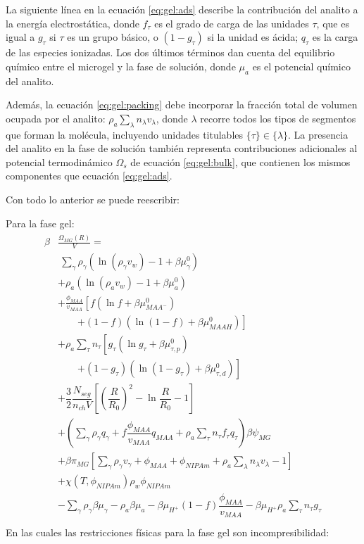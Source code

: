 La siguiente l\'inea en la ecuaci\'on \ref{eq:gel:ads} describe la contribuci\'on del analito a la energ\'ia electrost\'atica, donde $f_\tau$ es el grado de carga de las unidades $\tau$, que es igual a $g_\tau$ si $\tau$ es un grupo b\'asico, o $(1-g_\tau)$ si la unidad es \'acida; $q_\tau$ es la carga de las especies ionizadas.
Los dos \'ultimos t\'erminos dan cuenta del equilibrio qu\'imico entre el microgel y la fase de soluci\'on, donde $\mu_a$ es el potencial qu\'imico del analito.

Adem\'as, la ecuaci\'on \ref{eq:gel:packing} debe incorporar la fracci\'on total de volumen ocupada por el analito: $\rho_a \sum_\lambda n_\lambda v_\lambda$, donde $\lambda$ recorre todos los tipos de segmentos que forman la mol\'ecula, incluyendo unidades titulables $\{\tau\}\in\{\lambda\}$.
La presencia del analito en la fase de soluci\'on tambi\'en representa contribuciones adicionales al potencial termodin\'amico $\Omega_s$ de ecuaci\'on \ref{eq:gel:bulk}, que contienen los mismos componentes que ecuaci\'on \ref{eq:gel:ads}.

Con todo lo anterior se puede reescribir:

Para la fase gel:
\begin{align}
	\begin{aligned}
		\beta&\frac{\Omega_{MG}(R)}{V}=\\
		& ~ \sum_{\gamma} \rho_\gamma\left(\ln\left(\rho_\gamma v_w\right) -1 + \beta\mu^0_\gamma\right) \\
		&+ \rho_a\left(\ln\left(\rho_a v_w\right) -1 + \beta\mu^0_a\right) \\
		& + \frac{\phi_{MAA}}{v_{MAA}} \left[f(\ln f+ \beta\mu^0_{MAA^-})\right.\\
		&\qquad\left.+(1-f)(\ln (1-f)+\beta\mu^0_{MAAH})\right] \\
		& + \rho_a \sum_\tau n_\tau  \left[g_\tau(\ln g_\tau+ \beta\mu^0_{\tau,p})\right.\\
		&\qquad\left.+(1-g_\tau)(\ln (1-g_\tau)+\beta\mu^0_{\tau,d})\right] \\
		& + \dfrac{3}{2}\dfrac{N_{seg}}{n_{ch} V}\left[\left(\dfrac{R}{R_0}\right)^2 - \ln\dfrac{R}{R_0} -1\right] \\
		& +  \left(\sum_{\gamma } {\rho_\gamma q_\gamma + f\dfrac{\phi_{MAA}}{v_{MAA}}q_{MAA}} + \rho_a \sum_\tau n_\tau f_\tau q_\tau \right)\beta\psi_{MG}\\
		& +\beta\pi_{MG} \left[ \sum_{\gamma } \rho_\gamma v_\gamma  + \phi_{MAA} + \phi_{NIPAm} + \rho_a \sum_\lambda n_\lambda v_\lambda -1 \right] \\
		& + \chi (T, \phi_{NIPAm})\rho_w \phi_{NIPAm} \\
		& -\sum_{\gamma }{\rho_\gamma\beta\mu_\gamma} -\rho_a\beta\mu_a
		-\beta\mu_{H^+}(1-f)\dfrac{\phi_{MAA}}{v_{MAA}} 
		-\beta\mu_{H^+} \rho_a \sum_\tau n_\tau g_\tau\\
	\end{aligned}
	\label{eq:gel:total}
\end{align}
En las cuales las restricciones f\'isicas para la fase gel son incompresibilidad:


